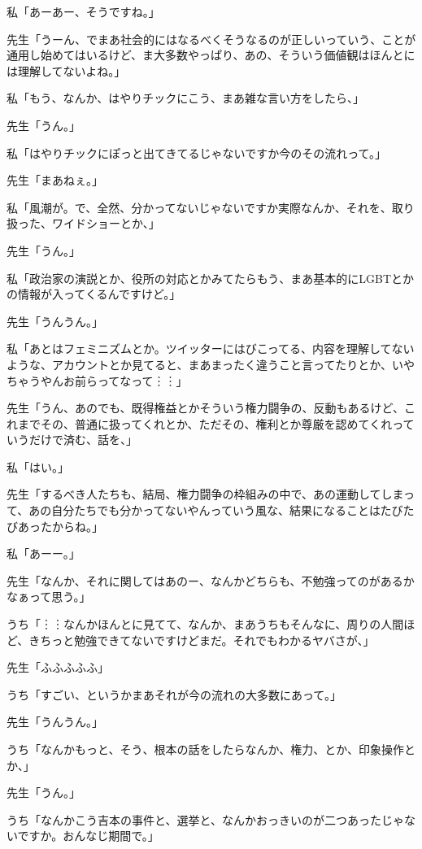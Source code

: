 \documentclass[b5j,twoside,twocolumn]{utarticle}
\begin{document}
\begin{description}
\item 私「あーあー、そうですね。」
\item 先生「うーん、でまあ社会的にはなるべくそうなるのが正しいっていう、ことが通用し始めてはいるけど、ま大多数やっぱり、あの、そういう価値観はほんとには理解してないよね。」
\item 私「もう、なんか、はやりチックにこう、まあ雑な言い方をしたら、」
\item 先生「うん。」
\item 私「はやりチックにぽっと出てきてるじゃないですか今のその流れって。」
\item 先生「まあねぇ。」
\item 私「風潮が。で、全然、分かってないじゃないですか実際なんか、それを、取り扱った、ワイドショーとか、」
\item 先生「うん。」
\item 私「政治家の演説とか、役所の対応とかみてたらもう、まあ基本的にLGBTとかの情報が入ってくるんですけど。」
\item 先生「うんうん。」
\item 私「あとはフェミニズムとか。ツイッターにはびこってる、内容を理解してないような、アカウントとか見てると、まあまったく違うこと言ってたりとか、いやちゃうやんお前らってなって︙︙」
\item 先生「うん、あのでも、既得権益とかそういう権力闘争の、反動もあるけど、これまでその、普通に扱ってくれとか、ただその、権利とか尊厳を認めてくれっていうだけで済む、話を、」
\item 私「はい。」
\item 先生「するべき人たちも、結局、権力闘争の枠組みの中で、あの運動してしまって、あの自分たちでも分かってないやんっていう風な、結果になることはたびたびあったからね。」
\item 私「あーー。」
\item 先生「なんか、それに関してはあのー、なんかどちらも、不勉強ってのがあるかなぁって思う。」
\item うち「︙︙なんかほんとに見てて、なんか、まあうちもそんなに、周りの人間ほど、きちっと勉強できてないですけどまだ。それでもわかるヤバさが、」
\item 先生「ふふふふふ」
\item うち「すごい、というかまあそれが今の流れの大多数にあって。」
\item 先生「うんうん。」
\item うち「なんかもっと、そう、根本の話をしたらなんか、権力、とか、印象操作とか、」
\item 先生「うん。」
\item うち「なんかこう吉本の事件と、選挙と、なんかおっきいのが二つあったじゃないですか。おんなじ期間で。」

\end{description}
\end{document}
